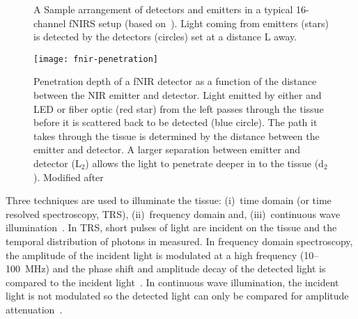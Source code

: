 \begin{figure}[tb]
  \centering
  
  \caption[Sample arrangement of detectors and emitters in a typical fNIRS setup]{\label{fig:fnir-arragement}A Sample arrangement of detectors and emitters in a typical 16-channel fNIRS setup (based on~\citet{izzetoglu2004}). Light coming from emitters (stars) is detected by the detectors (circles) set at a distance L away.}
\end{figure}
\begin{figure}[tb]
  \centering
  \texttt{[image: fnir-penetration]}
  \caption[Penetration by fNIR]{\label{fig:fnirpenetration}Penetration depth of a fNIR detector as a function of the distance between the NIR emitter and detector.  Light emitted by either and LED or fiber optic (red star) from the left passes through the tissue before it is scattered back to be detected (blue circle).  The path it takes through the tissue is determined by the distance between the emitter and detector.  A larger separation between emitter and detector (L$_2$) allows the light to penetrate deeper in to the tissue (d$_2$).  Modified after~\citep{head2010}}
\end{figure}

Three techniques are used to illuminate the tissue: (i)~time domain (or time resolved spectroscopy, TRS), (ii)~frequency domain and, (iii)~continuous wave illumination~\citep{izzetoglu2004}.  In TRS, short pulses of light are incident on the tissue and the temporal distribution of photons in measured.  In frequency domain spectroscopy, the amplitude of the incident light is modulated at a high frequency (10--100~MHz) and the phase shift and amplitude decay of the detected light is compared to the incident light~\citep{boas2002}. In continuous wave illumination, the incident light is not modulated so the detected light can only be compared for amplitude attenuation~\citep{izzetoglu2004}.

